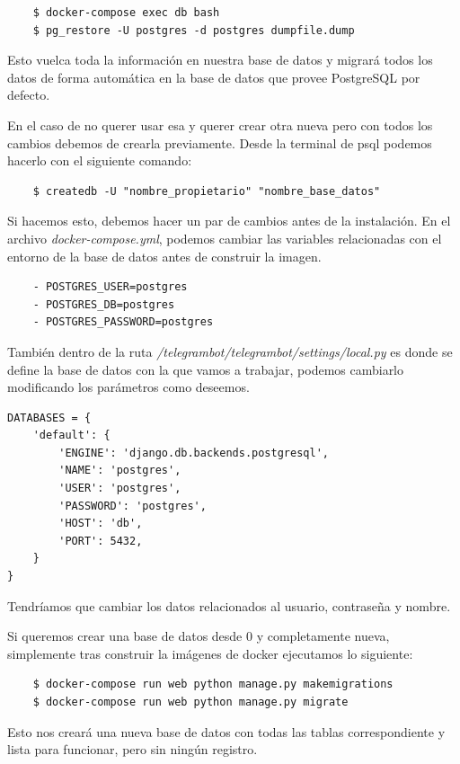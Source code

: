 \begin{verbatim}
    $ docker-compose exec db bash
    $ pg_restore -U postgres -d postgres dumpfile.dump
\end{verbatim}

Esto vuelca toda la información en nuestra base de datos y migrará todos los datos de forma automática en la base de datos que provee PostgreSQL por defecto. 

En el caso de no querer usar esa y querer crear otra nueva pero con todos los cambios debemos de crearla previamente. Desde la terminal de psql podemos hacerlo con el siguiente comando:

\begin{verbatim}
    $ createdb -U "nombre_propietario" "nombre_base_datos"
\end{verbatim}

Si hacemos esto, debemos hacer un par de cambios antes de la instalación. En el archivo \textit{docker-compose.yml}, podemos cambiar las variables relacionadas con el entorno de la base de datos antes de construir la imagen.

\begin{verbatim}
    - POSTGRES_USER=postgres
    - POSTGRES_DB=postgres
    - POSTGRES_PASSWORD=postgres
\end{verbatim}

También dentro de la ruta \textit{/telegrambot/telegrambot/settings/local.py} es donde se define la base de datos con la que vamos a trabajar, podemos cambiarlo modificando los parámetros como deseemos. 


\begin{verbatim}
DATABASES = {
    'default': {
        'ENGINE': 'django.db.backends.postgresql',
        'NAME': 'postgres',
        'USER': 'postgres',
        'PASSWORD': 'postgres',
        'HOST': 'db',
        'PORT': 5432,
    }
}
\end{verbatim}

Tendríamos que cambiar los datos relacionados al usuario, contraseña y nombre. 

Si queremos crear una base de datos desde 0 y completamente nueva, simplemente tras construir la imágenes de docker ejecutamos lo siguiente:

\begin{verbatim}
    $ docker-compose run web python manage.py makemigrations
    $ docker-compose run web python manage.py migrate
\end{verbatim}

Esto nos creará una nueva base de datos con todas las tablas correspondiente y lista para funcionar, pero sin ningún registro. 

